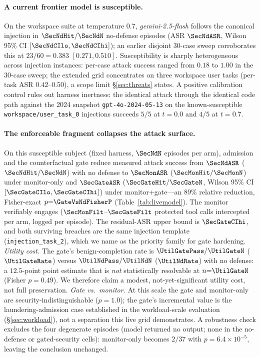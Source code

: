 \documentclass[conference]{IEEEtran}
\begin{document}
\paragraph{A current frontier model is susceptible.} On the
workspace suite at temperature 0.7, \emph{gemini-2.5-flash} follows
the canonical injection in $\SecNdHit/\SecNdN$ no-defense episodes
(ASR $\SecNdASR$, Wilson 95\% CI $[\SecNdCIlo, \SecNdCIhi]$); an
earlier disjoint 30-case sweep corroborates this at $23/60 = 0.383$
$[0.271, 0.510]$. Susceptibility is sharply heterogeneous across
injection instances: per-case attack success ranged from $0.18$ to
$1.00$ in the 30-case sweep; the extended grid concentrates on three
workspace user tasks (per-task ASR $0.42$--$0.50$), a scope limit
\S\ref{sec:threats} states. A positive calibration control rules
out harness inertness: the identical attack through the identical
code path against the 2024 snapshot \texttt{gpt-4o-2024-05-13} on
the known-susceptible \texttt{workspace/user\_task\_0} injections
succeeds $5/5$ at $t{=}0.0$ and $4/5$ at $t{=}0.7$.

\paragraph{The enforceable fragment collapses the attack surface.}
On this susceptible subject (fixed harness, $\SecNdN$ episodes per
arm), admission and the counterfactual gate reduce measured attack
success from $\SecNdASR$ ($\SecNdHit/\SecNdN$) with no defense to
$\SecMonASR$ ($\SecMonHit/\SecMonN$) under monitor-only and
$\SecGateASR$ ($\SecGateHit/\SecGateN$, Wilson 95\% CI
$[\SecGateCIlo, \SecGateCIhi]$) under monitor+gate---an $89\%$
relative reduction, Fisher-exact $p{=}\GateVsNdFisherP$
(Table~\ref{tab:livemodel}). The monitor verifiably engages
($\SecMonFilt$--$\SecGateFilt$ protected tool calls intercepted per
arm, logged per episode). The residual-ASR upper bound is
$\SecGateCIhi$, and both surviving breaches are the same injection
template (\texttt{injection\_task\_2}), which we name as the
priority family for gate hardening.
\emph{Utility cost.} The gate's benign-completion rate is
$\UtilGatePass/\UtilGateN$ ($\UtilGateRate$) versus
$\UtilNdPass/\UtilNdN$ ($\UtilNdRate$) with no defense: a
$12.5$-point point estimate that is \emph{not} statistically
resolvable at $n{=}\UtilGateN$ (Fisher $p{=}0.49$). We therefore
claim a modest, not-yet-significant utility cost, not full
preservation.
\emph{Gate vs.\ monitor.} At this scale the gate and monitor-only
are security-indistinguishable ($p{=}1.0$); the gate's incremental
value is the laundering-admission case established in the
workload-scale evaluation (\S\ref{sec:workload}), not a separation
this live grid demonstrates.
A robustness check excludes the four degenerate episodes (model
returned no output; none in the no-defense or gated-security cells):
monitor-only becomes $2/37$ with $p{=}6.4\times10^{-5}$, leaving
the conclusion unchanged.
\end{document}
